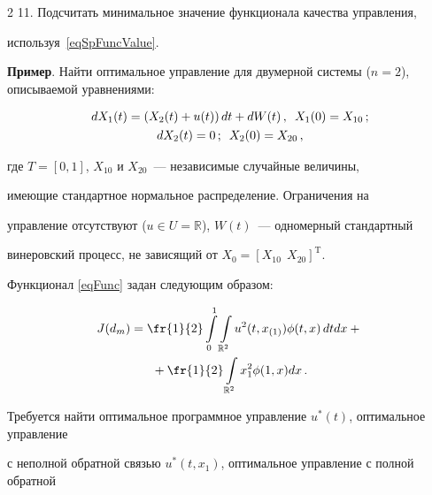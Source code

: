 \begin{multicols}{2}
11. Подсчитать минимальное значение функционала качества управления, 


используя~\eqref{eqSpFuncValue}.








\medskip





\noindent


\textbf{Пример}. Найти оптимальное управление для двумерной сис\-те\-мы (${n = 2}$), описываемой уравнениями:


  \begin{gather*} 


    dX_1(t) = \left( X_2(t) + u(t) \right) dt + dW(t)\,, \enskip X_1(0) = X_{10}\,; \\


    dX_2(t) = 0\,; \enskip X_2(0) = X_{20}\,,


  \end{gather*}


где ${T = [0,1]}$, $X_{10}$ и $X_{20}$~--- независимые случайные величины, 


имеющие стандартное нормальное распределение. Ограничения на 


управление отсутствуют (${u \in U = \mathbb{R}}$), $W(t)$~--- одномерный стандартный 


винеровский процесс, не зависящий от ${X_0 = [X_{10} \:\: X_{20}]^\mathrm{T}}$.





Функционал \eqref{eqFunc} задан следующим образом:


\begin{multline*}


  J(d_m) = \fr{1}{2} \int\limits_0^1 \int\limits_{\mathbb{R}^2} {u^2(t,x_{(1)}) \phi(t,x)\, dt dx} + {}\\


  {}+


  \fr{1}{2}  \int\limits_{\mathbb{R}^2} x_1^2 \phi(1,x) dx\,.


\end{multline*}





Требуется найти оптимальное программное управление $u^*(t)$, оптимальное управление 


с неполной обратной связью $u^*(t,x_1)$, оптимальное управление с полной обратной 



\end{multicols}
